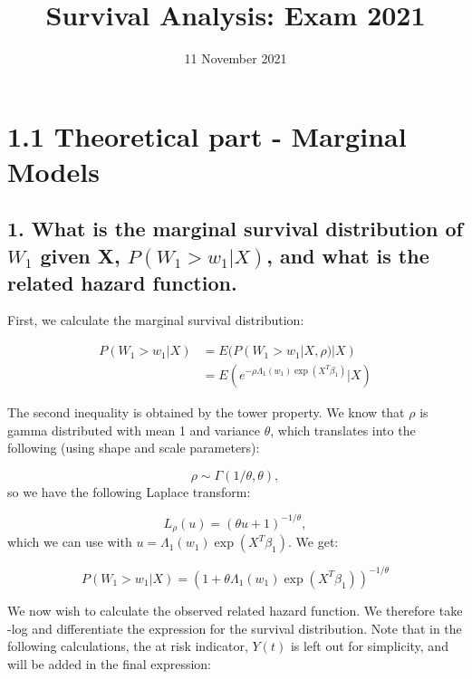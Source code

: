 \documentclass[
  11pt,
]{article}
\title{Survival Analysis: Exam 2021}
\author{}
\date{\vspace{-2.5em}\small 11 November 2021}
\begin{document}
\maketitle

\newpage

\hypertarget{theoretical-part---marginal-models}{%
\section{1.1 Theoretical part - Marginal
Models}\label{theoretical-part---marginal-models}}

\hypertarget{what-is-the-marginal-survival-distribution-of-w_1-given-x-pw_1-w_1-x-and-what-is-the-related-hazard-function.}{%
\subsection{\texorpdfstring{1. What is the marginal survival
distribution of \(W_1\) given X, \(P(W_1 > w_1 | X)\), and what is the
related hazard
function.}{1. What is the marginal survival distribution of W\_1 given X, P(W\_1 \textgreater{} w\_1 \textbar{} X), and what is the related hazard function.}}\label{what-is-the-marginal-survival-distribution-of-w_1-given-x-pw_1-w_1-x-and-what-is-the-related-hazard-function.}}

First, we calculate the marginal survival distribution:

\begin{align*}
P(W_1 > w_1 | X) &= E(P(W_1 > w_1 | X, \rho)|X) \\
&=E(e^{-\rho \Lambda_1(w_1) \exp(X^T\beta_1)}|X)
\end{align*}

The second inequality is obtained by the tower property. We know that
\(\rho\) is gamma distributed with mean 1 and variance \(\theta\), which
translates into the following (using shape and scale parameters):

\[
\rho \sim \Gamma(1/\theta , \theta), 
\] so we have the following Laplace transform:

\[
L_{\rho}(u)=(\theta u +1)^{-1/\theta},
\] which we can use with \(u=\Lambda_1(w_1) \exp(X^T\beta_1)\). We get:

\[
P(W_1 > w_1 | X) = (1+\theta \Lambda_1(w_1) \exp(X^T\beta_1))^{-1/\theta}
\]

We now wish to calculate the observed related hazard function. We
therefore take -log and differentiate the expression for the survival
distribution. Note that in the following calculations, the at risk
indicator, \(Y(t)\) is left out for simplicity, and will be added in the
final expression:
\end{document}
